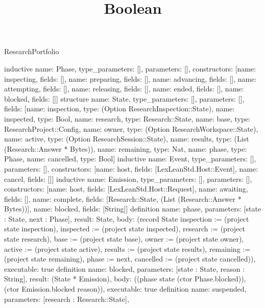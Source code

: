\begin{lexlean}{ResearchPortfolio}
\title{Boolean}
\begin{semanticmodule}
inductive{
 name: Phase,
 type_parameters: [],
 parameters: [],
 constructors: [{name: inspecting, fields: []}, {name: preparing, fields: []}, {name: advancing, fields: []}, {name: attempting, fields: []}, {name: releasing, fields: []}, {name: ended, fields: []}, {name: blocked, fields: []}]
}
structure{
 name: State,
 type_parameters: [],
 parameters: [],
 fields: [{name: inspection, type: (Option ResearchInspection::State)}, {name: inspected, type: Bool}, {name: research, type: Research::State}, {name: base, type: ResearchProject::Config}, {name: owner, type: (Option ResearchWorkspace::State)}, {name: active, type: (Option ResearchSession::State)}, {name: results, type: (List (Research::Answer * Bytes))}, {name: remaining, type: Nat}, {name: phase, type: Phase}, {name: cancelled, type: Bool}]
}
inductive{
 name: Event,
 type_parameters: [],
 parameters: [],
 constructors: [{name: host, fields: [LexLeanStd.Host::Event]}, {name: cancel, fields: []}]
}
inductive{
 name: Emission,
 type_parameters: [],
 parameters: [],
 constructors: [{name: host, fields: [LexLeanStd.Host::Request]}, {name: awaiting, fields: []}, {name: complete, fields: [Research::State, (List (Research::Answer * Bytes))]}, {name: blocked, fields: [String]}]
}
definition{
 name: phase,
 parameters: [state : State, next : Phase],
 result: State,
 body: (record State {inspection := (project state inspection), inspected := (project state inspected), research := (project state research), base := (project state base), owner := (project state owner), active := (project state active), results := (project state results), remaining := (project state remaining), phase := next, cancelled := (project state cancelled)}),
 executable: true
}
definition{
 name: blocked,
 parameters: [state : State, reason : String],
 result: (State * Emission),
 body: ((phase state (ctor Phase.blocked)), (ctor Emission.blocked reason)),
 executable: true
}
definition{
 name: suspended,
 parameters: [research : Research::State],
}
\end{semanticmodule}
\end{lexlean}
